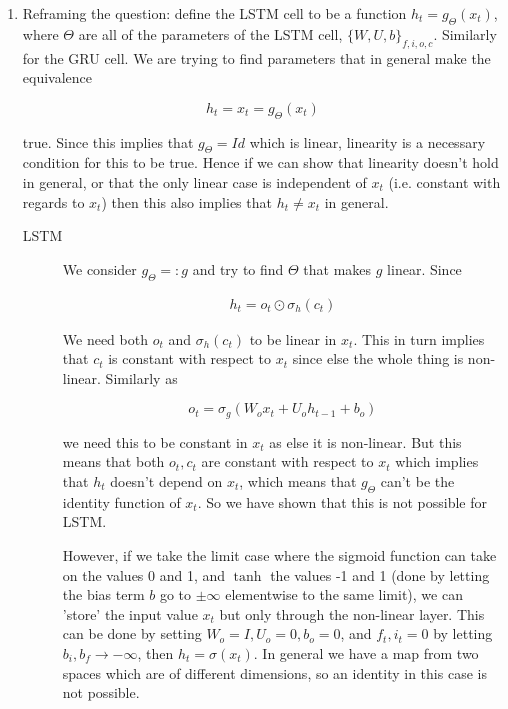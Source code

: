 \documentclass{article}
\begin{document}
\begin{enumerate}   
\item

  Reframing the question: define the LSTM cell to be a function $h_t =
  g_{\Theta}(x_{t})$, where $\Theta$ are all of the parameters of the LSTM
  cell, $\{W, U, b\}_{f, i, o, c}$. Similarly for the GRU cell. We are trying to
  find parameters that in general make the equivalence

  \begin{equation}
    h_t = x_{t} = g_{\Theta}(x_{t})
  \end{equation}

  true. Since this implies that $g_{\Theta} = Id$ which is linear, linearity is
  a necessary condition for this to be true. Hence if we can show that linearity
  doesn't hold in general, or that the only linear case is independent of $x_t$
  (i.e. constant with regards to $x_t$) then this also implies that $h_t \neq x_{t}$ in
  general.

    \begin{description}
  \item[LSTM] We consider $g_{\Theta} =: g$ and try to find $\Theta$ that makes
    $g$ linear. Since

    \begin{align*}
      h_t = o_t \odot \sigma_h( c_t )
    \end{align*}

    We need both $o_t$ and $\sigma_h( c_t )$ to be linear in $x_t$. This in turn
    implies that $c_t$ is constant with respect to $x_t$ since else the whole
    thing is non-linear. Similarly as

    \begin{equation*}
      o_t = \sigma_g (W_o x_t + U_o h_{t-1} + b_o)
    \end{equation*}

    we need this to be constant in $x_t$ as else it is non-linear. But this
    means that both $o_t, c_t$ are constant with respect to $x_t$ which implies
    that $h_t$ doesn't depend on $x_t$, which means that $g_{\Theta}$ can't be the
    identity function of $x_t$. So we have shown that this is not possible for
    LSTM.

    However, if we take the limit case where the sigmoid function can take on
    the values 0 and 1, and $\tanh$ the values -1 and 1 (done by letting the
    bias term $b$ go to $\pm \infty$ elementwise to the same limit), we can 'store' the
    input value $x_t$ but only through the non-linear layer. This can be done by
    setting $W_o = I, U_o = 0, b_o = 0$, and $f_t, i_t = 0$ by letting $b_i, b_f
    \to - \infty$, then $h_t = \sigma(x_t)$. In general we have a map from two
    spaces which are of different dimensions, so an identity in this case is not
    possible.
    

\end{description}
\end{enumerate}
\end{document}
